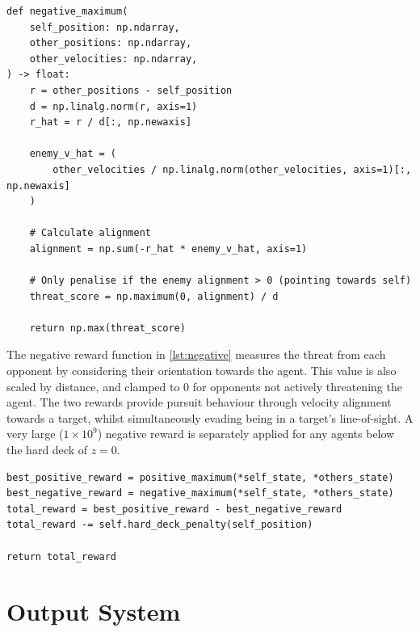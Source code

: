 \begin{listing}[H]
\begin{verbatim}
def negative_maximum(
    self_position: np.ndarray,
    other_positions: np.ndarray,
    other_velocities: np.ndarray,
) -> float:
    r = other_positions - self_position
    d = np.linalg.norm(r, axis=1)
    r_hat = r / d[:, np.newaxis]

    enemy_v_hat = (
        other_velocities / np.linalg.norm(other_velocities, axis=1)[:, np.newaxis]
    )

    # Calculate alignment
    alignment = np.sum(-r_hat * enemy_v_hat, axis=1)

    # Only penalise if the enemy alignment > 0 (pointing towards self)
    threat_score = np.maximum(0, alignment) / d

    return np.max(threat_score)
\end{verbatim}
\caption{Negative reward function.}
\label{lst:negative}
\end{listing}

The negative reward function in \cref{lst:negative} measures the threat from each opponent by considering their orientation towards the agent. This value is also scaled by distance, and clamped to $0$ for opponents not actively threatening the agent. The two rewards provide pursuit behaviour through velocity alignment towards a target, whilst simultaneously evading being in a target's line-of-sight. A very large ($1 \times 10^9$) negative reward is separately applied for any agents below the hard deck of $z = 0$.

\begin{listing}[H]
\begin{verbatim}
best_positive_reward = positive_maximum(*self_state, *others_state)
best_negative_reward = negative_maximum(*self_state, *others_state)
total_reward = best_positive_reward - best_negative_reward
total_reward -= self.hard_deck_penalty(self_position)

return total_reward
\end{verbatim}
\caption{Calculate final reward.}
\label{lst:combine}
\end{listing}



\section{Output System}
\label{sec:3.4}


